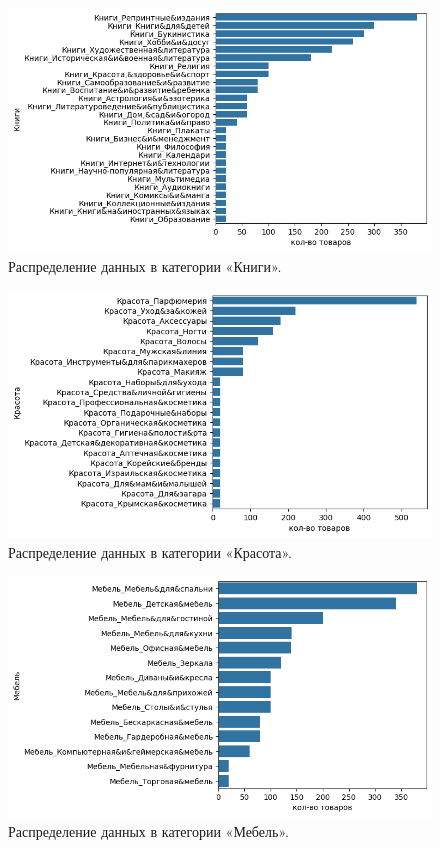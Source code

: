 \documentclass[a4paper,12pt]{extarticle}
\begin{document}
\begin{figure}[hbtp]
	\centering
	\includegraphics[scale=0.8]{приложения/amount_of_category_Книги.png}
	\caption{Распределение данных в категории «Книги».}
	\label{fig:amount_of_category_Книги}
\end{figure}

\begin{figure}[hbtp]
	\centering
	\includegraphics[scale=0.8]{приложения/amount_of_category_Красота.png}
	\caption{Распределение данных в категории «Красота».}
	\label{fig:amount_of_category_Красота}
\end{figure}

\begin{figure}[hbtp]
	\centering
	\includegraphics[scale=0.8]{приложения/amount_of_category_Мебель.png}
	\caption{Распределение данных в категории «Мебель».}
	\label{fig:amount_of_category_Мебель}
\end{figure}
\end{document}
